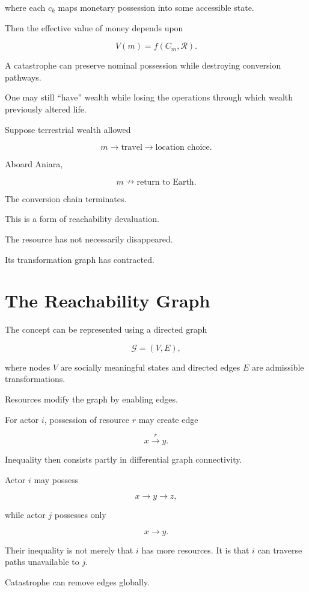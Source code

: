 \documentclass[11pt,oneside]{book}
\theoremstyle{definition}
\theoremstyle{remark}
\newcommand{\R}{\mathcal{R}}
\begin{document}
where each \(c_k\) maps monetary possession into some accessible state.

Then the effective value of money depends upon

\[
V(m)
=
f(C_m,\R).
\]

A catastrophe can preserve nominal possession while destroying conversion pathways.

One may still ``have'' wealth while losing the operations through which wealth previously altered life.

Suppose terrestrial wealth allowed

\[
m
\rightarrow
\text{travel}
\rightarrow
\text{location choice}.
\]

Aboard Aniara,

\[
m
\nrightarrow
\text{return to Earth}.
\]

The conversion chain terminates.

This is a form of reachability devaluation.

The resource has not necessarily disappeared.

Its transformation graph has contracted.

\section{The Reachability Graph}

The concept can be represented using a directed graph

\[
\mathcal G=(V,E),
\]

where nodes \(V\) are socially meaningful states and directed edges \(E\) are admissible transformations.

Resources modify the graph by enabling edges.

For actor \(i\), possession of resource \(r\) may create edge

\[
x\overset{r}{\longrightarrow}y.
\]

Inequality then consists partly in differential graph connectivity.

Actor \(i\) may possess

\[
x\rightarrow y\rightarrow z,
\]

while actor \(j\) possesses only

\[
x\rightarrow y.
\]

Their inequality is not merely that \(i\) has more resources. It is that \(i\) can traverse paths unavailable to \(j\).

Catastrophe can remove edges globally.
\end{document}
